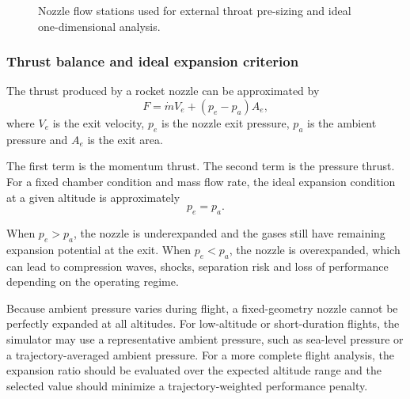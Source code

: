 \begin{figure}[H]
\caption{Nozzle flow stations used for external throat pre-sizing and ideal one-dimensional analysis.}
\label{fig:flow_stations_tikz}
\end{figure}

\subsubsection{Thrust balance and ideal expansion criterion}

The thrust produced by a rocket nozzle can be approximated by
\begin{equation}
F=\dot{m}V_e+(p_e-p_a)A_e,
\label{eq:thrust}
\end{equation}
where $V_e$ is the exit velocity, $p_e$ is the nozzle exit pressure, $p_a$ is the ambient pressure and $A_e$ is the exit area.

The first term is the momentum thrust. The second term is the pressure thrust. For a fixed chamber condition and mass flow rate, the ideal expansion condition at a given altitude is approximately
\begin{equation}
p_e=p_a .
\label{eq:ideal_expansion}
\end{equation}

When $p_e>p_a$, the nozzle is underexpanded and the gases still have remaining expansion potential at the exit. When $p_e<p_a$, the nozzle is overexpanded, which can lead to compression waves, shocks, separation risk and loss of performance depending on the operating regime.

Because ambient pressure varies during flight, a fixed-geometry nozzle cannot be perfectly expanded at all altitudes. For low-altitude or short-duration flights, the simulator may use a representative ambient pressure, such as sea-level pressure or a trajectory-averaged ambient pressure. For a more complete flight analysis, the expansion ratio should be evaluated over the expected altitude range and the selected value should minimize a trajectory-weighted performance penalty.

